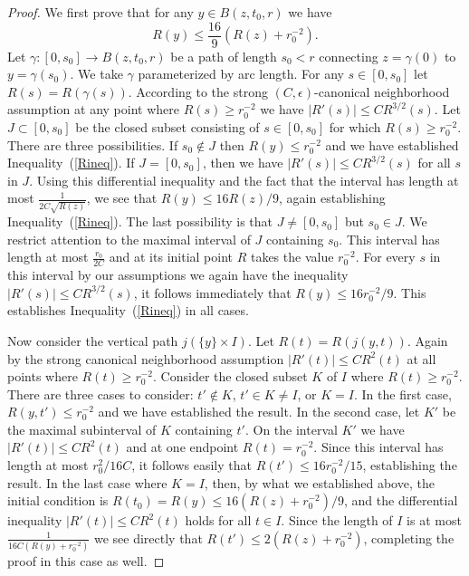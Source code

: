 \begin{proof}
We first  prove that for any $y\in B(z,t_0,r)$ we have
\begin{equation}\label{Rineq}
R(y)\le \frac{16}{9}(R(z)+r_0^{-2}).\end{equation} Let $\gamma\colon
[0,s_0]\to B(z,t_0,r)$ be a path of length $s_0<r$ connecting
$z=\gamma(0)$ to $y=\gamma(s_0)$. We take $\gamma$ parameterized by
arc length. For any $s\in [0,s_0]$ let $R(s)=R(\gamma(s))$.
According to the strong $(C,\epsilon)$-canonical neighborhood
assumption at any point where $R(s)\ge r_0^{-2}$ we have $|R'(s)|\le
CR^{3/2}(s)$. Let $J\subset [0,s_0]$ be the closed subset consisting
of $s\in [0,s_0]$ for which $R(s)\ge r_0^{-2}$. There are three
possibilities. If $s_0\not\in J$ then $R(y)\le r_0^{-2}$ and we have
established Inequality~(\ref{Rineq}). If $J=[0,s_0]$, then we have
$|R'(s)|\le CR^{3/2}(s)$ for all $s$ in $J$. Using this differential
inequality and the fact that the interval has length at most
$\frac{1}{2C\sqrt{R(z)}}$, we see that $R(y)\le 16R(z)/9$, again
establishing Inequality~(\ref{Rineq}). The last possibility is that
$J\not= [0,s_0]$ but $s_0\in J$. We restrict attention to the
maximal interval of $J$ containing $s_0$. This interval has length
at most $\frac{r_0}{2C}$ and at its initial point $R$ takes the
value $r_0^{-2}$. For every $s$ in this interval by our assumptions
we again have the inequality $|R'(s)|\le CR^{3/2}(s)$, it follows
immediately that $R(y)\le 16r_0^{-2}/9$. This establishes
Inequality~(\ref{Rineq}) in all cases.


Now consider the vertical path $j(\{y\}\times I)$. Let
$R(t)=R(j(y,t))$. Again by the strong canonical neighborhood
assumption $|R'(t)|\le CR^2(t)$ at all points where $R(t)\ge
r_0^{-2}$. Consider the closed subset $K$ of $I$ where $R(t)\ge
r_0^{-2}$. There are three cases to consider: $t'\not\in K$, $t'\in
K\not=I$, or $K=I$.  In the first case, $R(y,t')\le r_0^{-2}$ and we
have established the result. In the second case, let $K'$ be the
maximal subinterval of $K$ containing $t'$. On the interval $K'$ we
have $|R'(t)|\le CR^2(t)$ and at one endpoint $R(t)=r_0^{-2}$. Since
this interval has length at most $r_0^2/16C$, it follows easily that
$R(t')\le 16r_0^{-2}/15$, establishing the result. In the last case
where $K=I$, then, by what we established above, the initial
condition is $R(t_0)=R(y)\le 16(R(z)+r_0^{-2})/9$, and the
differential inequality $|R'(t)|\le CR^2(t)$ holds for all $t\in I$.
Since the length of $I$ is at most $\frac{1}{16C(R(y)+r_0^{-2})}$ we
see directly that $R(t')\le 2(R(z)+r_0^{-2})$, completing the proof
in this case as well.
\end{proof}

